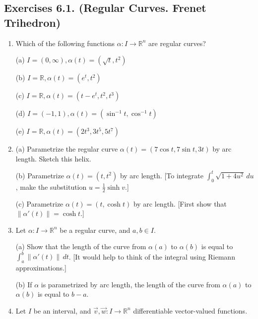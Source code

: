 \documentclass[leqno]{book}
\begin{document}
\subsection*{Exercises 6.1. (Regular Curves.  Frenet Trihedron)} %
\begin{enumerate}
\item Which of the following functions $\alpha:I\to\mathbb R^n$ are regular curves?

(a) $I=(0,\infty),\alpha(t)=(\sqrt t,t^2)$

(b) $I=\mathbb R,\alpha(t)=(e^t,t^2)$

(c) $I=\mathbb R,\alpha(t)=(t-e^t,t^2,t^3)$

(d) $I=(-1,1),\alpha(t)=(\sin^{-1}t,\cos^{-1}t)$

(e) $I=\mathbb R,\alpha(t)=(2t^3,3t^5,5t^7)$

\item (a) Parametrize the regular curve $\alpha(t)=(7\cos t,7\sin t,3t)$ by arc length.  Sketch this helix.

(b) Parametrize $\alpha(t)=(t,t^2)$ by arc length.  [To integrate $\int_0^t\sqrt{1+4u^2}\,du$, make the substitution $u=\frac 12\sinh v$.]

(c) Parametrize $\alpha(t)=(t,\cosh t)$ by arc length.  [First show that $\|\alpha'(t)\|=\cosh t$.]

\item Let $\alpha:I\to\mathbb R^n$ be a regular curve, and $a,b\in I$.

(a) Show that the length of the curve from $\alpha(a)$ to $\alpha(b)$ is equal to $\int_a^b\|\alpha'(t)\|\,dt$.  [It would help to think of the integral using Riemann approximations.]

(b) If $\alpha$ is parametrized by arc length, the length of the curve from $\alpha(a)$ to $\alpha(b)$ is equal to $b-a$.

\item Let $I$ be an interval, and $\vec v,\vec w:I\to\mathbb R^n$ differentiable vector-valued functions.


\end{enumerate}
\end{document}
